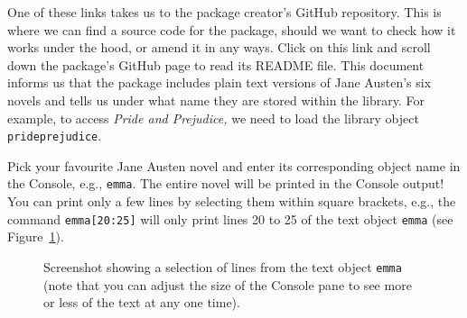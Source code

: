 \documentclass[
  letterpaper,
  DIV=11,
  numbers=noendperiod,
  oneside]{scrreprt}
\begin{document}
One of these links takes us to the package creator's GitHub repository.
This is where we can find a source code for the package, should we want
to check how it works under the hood, or amend it in any ways. Click on
this link and scroll down the package's GitHub page to read its README
file. This document informs us that the package includes plain text
versions of Jane Austen's six novels and tells us under what name they
are stored within the library. For example, to access \emph{Pride and
Prejudice,} we need to load the library object \texttt{prideprejudice}.
{}

Pick your favourite Jane Austen novel and enter its corresponding object
name in the Console, e.g., \texttt{emma}. The entire novel will be
printed in the Console output! You can print only a few lines by
selecting them within square brackets, e.g., the command
\texttt{emma{[}20:25{]}} will only print lines 20 to 25 of the text
object \texttt{emma} (see Figure~\ref{fig-emma2025}).

\begin{figure}


\caption{\label{fig-emma2025}Screenshot showing a selection of lines
from the text object \texttt{emma} (note that you can adjust the size of
the Console pane to see more or less of the text at any one time).}

\end{figure}%
\end{document}
